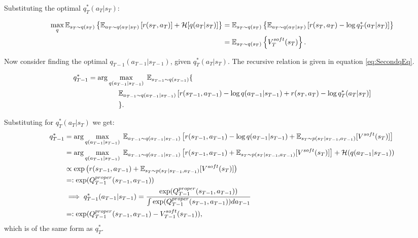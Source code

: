 \documentclass{report}
\numberwithin{equation}{section}
\numberwithin{figure}{section}
\numberwithin{table}{section}
\numberwithin{algorithm}{section}
\begin{document}
Substituting the optimal $q^*_T(a_T|s_T)$:

\begin{align*}
  \max_{q} \mathbb{E}_{s_T\sim q(s_T)}\left\{\mathbb{E}_{a_T\sim q(a_T|s_T)}\left[
    r(s_T, a_T)
  \right] + \mathcal{H}[q(a_T|s_T)]
  \right\}&=\mathbb{E}_{s_T\sim q(s_T)}\left\{
    \mathbb{E}_{a_T\sim q(a_T|s_T)}\left[
    r(s_T, a_T)
   -\log q^*_T(a_T|s_T)\right]\right\}\notag\\
   &=\mathbb{E}_{s_T\sim q(s_T)}\left\{
    V^{soft}_T(s_T)\right\}.
\end{align*}

Now consider finding the optimal $q_{T-1}(a_{T-1}|s_{T-1})$, 
given $q_T^*(a_T|s_T)$. The recursive relation is given 
in equation \ref{eq:SecondqEq}.

\begin{align}\label{eq:SecondqEq}
  q_{T-1}^*&=\arg \max_{q(a_{T-1}|s_{T-1})}\; \mathbb{E}_{s_{T-1}\sim q(s_{T-1})}\{\notag\\
    &\qquad\qquad \;\mathbb{E}_{a_{T-1}\sim q(a_{T-1}|s_{T-1})}
    \left[
      r(s_{T-1},a_{T-1}) - \log q(a_{T-1}|s_{T-1})
      + r(s_{T}, a_T) - \log q^*_{T}(a_T|s_T)
    \right]\notag\\
  &\qquad\qquad\;\}.
\end{align}

Substituting for $q^*_T(a_T|s_T)$ we get:
\begin{align*}
  q^*_{T-1}&=\arg \max_{q(a_{T-1}|s_{T-1})}\;
  \mathbb{E}_{a_{T-1}\sim q(a_{T-1}|s_{T-1})}
  \left[
    r(s_{T-1},a_{T-1}) - \log q(a_{T-1}|s_{T-1})
    + \mathbb{E}_{s_T\sim p(s_{T}|s_{T-1},a_{T-1})}[V^{soft}(s_T)]
  \right]\notag\\
  &=\arg \max_{q(a_{T-1}|s_{T-1})}\;
  \mathbb{E}_{a_{T-1}\sim q(a_{T-1}|s_{T-1})}
  \left[
    r(s_{T-1},a_{T-1}) + \mathbb{E}_{s_T\sim p(s_{T}|s_{T-1},a_{T-1})}[V^{soft}(s_T)]
  \right] + \mathcal{H}(q(a_{T-1}|s_{T-1}))\notag\\
  &\propto \exp\left(r(s_{T-1},a_{T-1}) + \mathbb{E}_{s_T\sim p(s_{T}|s_{T-1},a_{T-1})}[V^{soft}(s_T)]\right)\notag\\
  &=:\exp(Q^{proper}_{T-1}(s_{T-1}, a_{T-1}))\notag\\
  &\implies q^*_{T-1}(a_{T-1}|s_{T-1})=\frac{\exp(Q^{proper}_{T-1}(s_{T-1}, a_{T-1}))}{\int \exp(Q^{proper}_{T-1}(s_{T-1}, a_{T-1}))da_{T-1}}\notag\\
  &=:\exp(Q^{proper}_{T-1}(s_{T-1},a_{T-1})-V^{soft}_{T-1}(s_{T-1})),
\end{align*}
which is of the same form as $q^*_T$.
\end{document}
